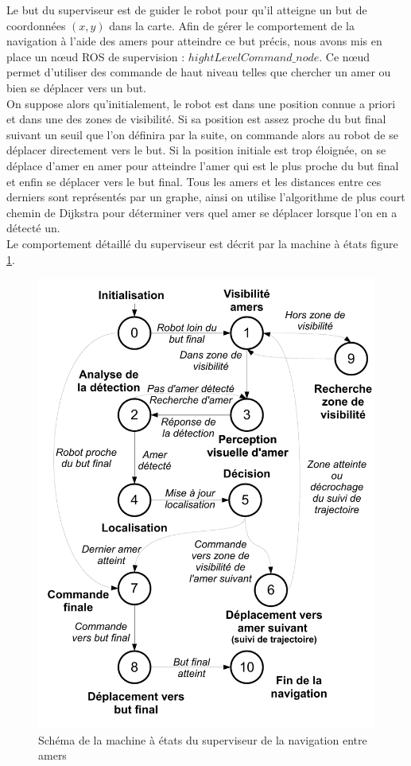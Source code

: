 \documentclass[10pt,a4paper]{article}
\begin{document}
Le but du superviseur est de guider le robot pour qu'il atteigne un but de coordonnées $(x,y)$ dans la carte. Afin de gérer le comportement de la navigation à l'aide des amers pour atteindre ce but précis, nous avons mis en place un nœud ROS de supervision : $hightLevelCommand\_node$. Ce nœud permet d'utiliser des commande de haut niveau telles que chercher un amer ou bien se déplacer vers un but.\\

On suppose alors qu'initialement, le robot est dans une position connue a priori et dans une des zones de visibilité. Si sa position est assez proche du but final suivant un seuil que l'on définira par la suite, on commande alors au robot de se déplacer directement vers le but. Si la position initiale est trop éloignée, on se déplace d'amer en amer pour atteindre l'amer qui est le plus proche du but final et enfin se déplacer vers le but final. Tous les amers et les distances entre ces derniers sont représentés par un graphe, ainsi on utilise l'algorithme de plus court chemin de Dijkstra pour déterminer vers quel amer se déplacer lorsque l'on en a détecté un.\\

Le comportement détaillé du superviseur est décrit par la machine à états figure \ref{HLC_MEF}.

\begin{figure}[!h]
\centering\includegraphics[scale=0.5]{figures/HLC_MEF.pdf}
\caption{Schéma de la machine à états du superviseur de la navigation entre amers}
\label{HLC_MEF}
\end{figure}
\end{document}
